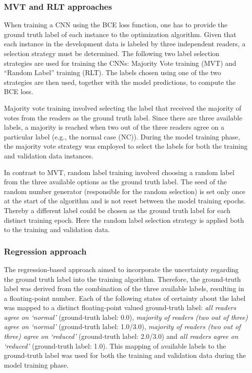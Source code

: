 \subsubsection{MVT and RLT approaches}
\label{subsubsec:cnn_based_classification_mvt_rlt}

When training a CNN using the BCE loss function, 
one has to provide the ground truth label of each instance to the optimization algorithm.
Given that each instance in the development data is labeled by three independent readers, 
a selection strategy must be determined.
The following two label selection strategies are used for training the CNNs: 
Majority Vote training (MVT) and “Random Label” training (RLT).
The labels chosen using one of the two strategies are then used, together with the model predictions, 
to compute the BCE loss.

Majority vote training involved selecting the label that received the majority of votes from the readers as the 
ground truth label.
Since there are three available labels, 
a majority is reached when two out of the three readers agree on a particular label (e.g., the normal case (NC)).
During the model training phase, the majority vote strategy was employed to select the labels for both the training 
and validation data instances.

In contrast to MVT, random label training involved choosing a random label from the three available options
as the ground truth label.
The seed of the random number generator (responsible for the random selection) is set only once at the start of the
algorithm and is not reset between the model training epochs.
Thereby a different label could be chosen as the ground truth label for each distinct training epoch.
Here the random label selection strategy is applied both to the training and validation data.

\subsubsection{Regression approach}
\label{subsubsec:cnn_based_classification_regression}

The regression-based approach aimed to incorporate the uncertainty regarding the ground truth label 
into the training algorithm.
Therefore, the ground-truth label was derived from the combination of the three available labels, 
resulting in a floating-point number.
Each of the following states of certainty about the label was mapped to a distinct 
floating-point valued ground-truth label: 
\emph{all readers agree on `normal' } (ground-truth label: 0.0), 
\emph{majority of readers (two out of three) agree on `normal'} (ground-truth label: 1.0/3.0), 
\emph{majority of readers (two out of three) agree on `reduced'} (ground-truth label: 2.0/3.0) 
and \emph{all readers agree on `reduced'} (ground-truth label: 1.0).
This mapping of available labels to the ground-truth label was used for both the training 
and validation data during the model training phase.


